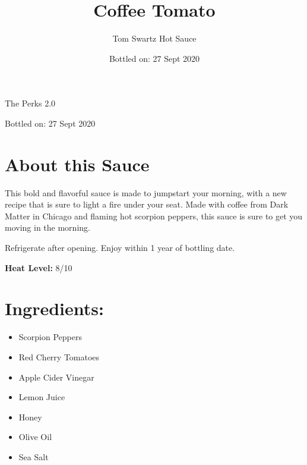 \documentclass[12pt]{article}
\title{Coffee Tomato}
\author{Tom Swartz Hot Sauce}
\date{Bottled on: 27 Sept 2020}
\begin{document}
\begin{center}
{\Huge The Perks 2.0}
\par
{\Large Bottled on: 27 Sept 2020}
\vfill
\begin{minipage}{0.45\textwidth}
\Large
\section*{About this Sauce \color{black}\hrulefill\color{black}}
This bold and flavorful sauce is made to jumpstart your morning, with a new
recipe that is sure to light a fire under your seat.
Made with coffee from Dark Matter in Chicago and flaming hot scorpion peppers,
this sauce is sure to get you moving in the morning.
\par
Refrigerate after opening.
Enjoy within 1 year of bottling date.
\begin{center}
        {\LARGE
        \textbf{Heat Level:} 8/10
        }
\end{center}
\end{minipage}
\hfill
\begin{minipage}{0.45\textwidth}
\vspace{-0.4cm}
\Large
\section*{\hspace{0.5cm}Ingredients: \color{black}\hrulefill\color{black}}
\begin{itemize}
        \item Scorpion Peppers
        \item Red Cherry Tomatoes
        \item Apple Cider Vinegar
        \item Lemon Juice
        \item Honey
        \item Olive Oil
        \item Sea Salt
\end{itemize}
\end{minipage}
\end{center}
\end{document}
